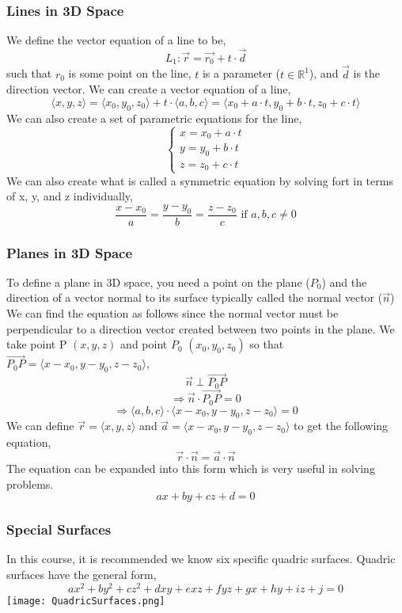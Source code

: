 \documentclass{article}
\begin{document}
\subsubsection{Lines in 3D Space}
We define the vector equation of a line to be,
$$L_1: \vec{r} = \vec{r_0} + t \cdot \vec{d}$$
such that $r_0$ is some point on the line, $t$ is a parameter ($t\in\mathbb{R}^1$), and $\vec{d}$ is the direction vector. We can create a vector equation of a line,
$$\langle x, y, z \rangle = \langle x_0,y_0,z_0\rangle+t\cdot\langle a,b,c\rangle= \langle x_0 + a \cdot t, y_0 + b\cdot t, z_0 + c \cdot t \rangle$$
We can also create a set of parametric equations for the line, 
$$\left\{\begin{array}{lr}
x = x_0 + a \cdot t \\
y = y_0 + b \cdot t \\
z = z_0 + c \cdot t
\end{array}
\right.$$
We can also create what is called a symmetric equation by solving fort in terms of x, y, and z individually,
$$\frac{x - x_0}{a} = \frac{y - y_0}{b} = \frac{z - z_0}{c} \text{ if } a,b,c \neq 0$$

\subsubsection{Planes in 3D Space}
To define a plane in 3D space, you need a point on the plane ($P_0$) and the direction of a vector normal to its surface typically called the normal vector ($\vec{n}$)
We can find the equation as follows since the normal vector must be perpendicular to a direction vector created between two points in the plane. We take point P $(x,y,z)$ and point $P_0$ $(x_0,y_0,z_0)$ so that $\vec{P_0P} = \langle x-x_0,y-y_0,z-z_0\rangle$,
$$\vec{n} \perp \overrightarrow{P_0P}$$
$$\Rightarrow \vec{n}\cdot\overrightarrow{P_0P}=0$$
$$\Rightarrow \langle a,b,c\rangle\cdot\langle x-x_0,y-y_0,z-z_0\rangle=0$$
We can define $\vec{r} = \langle x,y,z\rangle$ and $\vec{a} = \langle x-x_0,y-y_0,z-z_0\rangle$ to get the following equation, 
$$\vec{r} \cdot \vec{n} = \vec{a} \cdot \vec{n}$$ 
The equation can be expanded into this form which is very useful in solving problems. 
$$ax + by + cz + d = 0$$

\subsubsection{Special Surfaces}
In this course, it is recommended we know six specific quadric surfaces. Quadric surfaces have the general form, 
$$ax^2+by^2+cz^2+dxy+exz+fyz+gx+hy+iz+j=0$$
\texttt{[image: QuadricSurfaces.png]}
\end{document}
